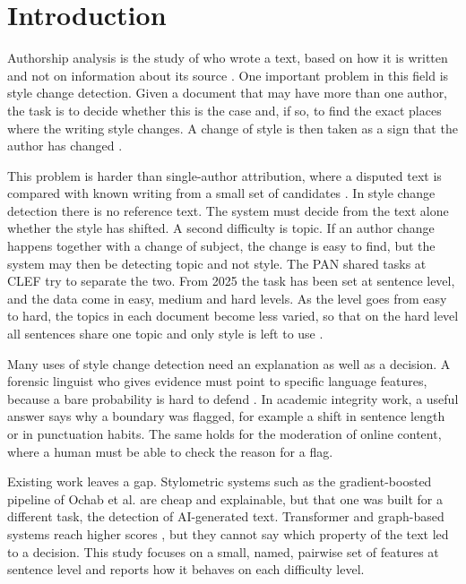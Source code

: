 \documentclass[runningheads]{llncs}
\begin{document}
\section{Introduction}

Authorship analysis is the study of who wrote a text, based on how it is written and not on information about its source \cite{bevendorff:2026a}. One important problem in this field is style change detection. Given a document that may have more than one author, the task is to decide whether this is the case and, if so, to find the exact places where the writing style changes. A change of style is then taken as a sign that the author has changed \cite{zangerle2020overview}.

This problem is harder than single-author attribution, where a disputed text is compared with known writing from a small set of candidates \cite{ramnial2015authorship}. In style change detection there is no reference text. The system must decide from the text alone whether the style has shifted. A second difficulty is topic. If an author change happens together with a change of subject, the change is easy to find, but the system may then be detecting topic and not style. The PAN shared tasks at CLEF try to separate the two. From 2025 the task has been set at sentence level, and the data come in easy, medium and hard levels. As the level goes from easy to hard, the topics in each document become less varied, so that on the hard level all sentences share one topic and only style is left to use \cite{zangerle:2026,zangerle_2026_19068843}.

Many uses of style change detection need an explanation as well as a decision. A forensic linguist who gives evidence must point to specific language features, because a bare probability is hard to defend \cite{6722273}. In academic integrity work, a useful answer says why a boundary was flagged, for example a shift in sentence length or in punctuation habits. The same holds for the moderation of online content, where a human must be able to check the reason for a flag.

Existing work leaves a gap. Stylometric systems such as the gradient-boosted pipeline of Ochab et al. \cite{ochab2025styloch} are cheap and explainable, but that one was built for a different task, the detection of AI-generated text. Transformer and graph-based systems reach higher scores \cite{chen2023writing,alsheddi2025team}, but they cannot say which property of the text led to a decision. This study focuses on a small, named, pairwise set of features at sentence level and reports how it behaves on each difficulty level.
\end{document}
